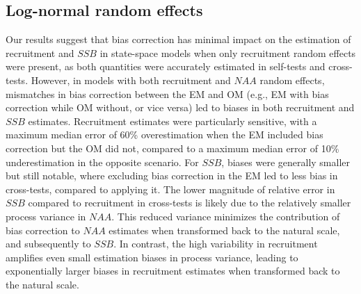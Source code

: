 \documentclass[
  12pt,
]{article}
\begin{document}
\subsection{Log-normal random effects}\label{log-normal-random-effects}

Our results suggest that bias correction has minimal impact on the
estimation of recruitment and \(SSB\) in state-space models when only
recruitment random effects were present, as both quantities were
accurately estimated in self-tests and cross-tests. However, in models
with both recruitment and \(NAA\) random effects, mismatches in bias
correction between the EM and OM (e.g., EM with bias correction while OM
without, or vice versa) led to biases in both recruitment and \(SSB\)
estimates. Recruitment estimates were particularly sensitive, with a
maximum median error of 60\% overestimation when the EM included bias
correction but the OM did not, compared to a maximum median error of
10\% underestimation in the opposite scenario. For \(SSB\), biases were
generally smaller but still notable, where excluding bias correction in
the EM led to less bias in cross-tests, compared to applying it. The
lower magnitude of relative error in \(SSB\) compared to recruitment in
cross-tests is likely due to the relatively smaller process variance in
\(NAA\). This reduced variance minimizes the contribution of bias
correction to \(NAA\) estimates when transformed back to the natural
scale, and subsequently to \(SSB\). In contrast, the high variability in
recruitment amplifies even small estimation biases in process variance,
leading to exponentially larger biases in recruitment estimates when
transformed back to the natural scale.
\end{document}
